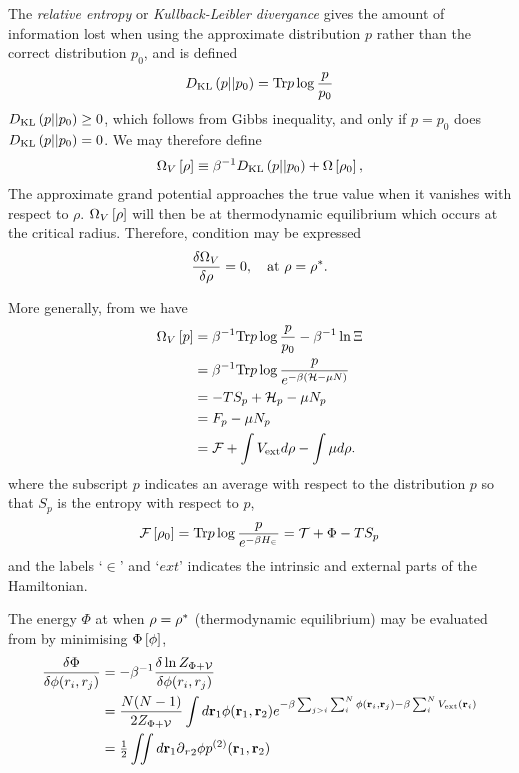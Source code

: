 {The {\em relative entropy } or {\em Kullback-Leibler divergance} gives the amount of information lost 
when using the approximate distribution  $p$ rather than the correct distribution $p_0$,
and is defined
\begin{align}
  D_{\text {KL}}\left( {p}||{p_0} \right) = \textrm{Tr} p \log \frac{p}{p_0} \label{eqn:nuc:KLD}
\end{align}
$D_{\text {KL}}\left( {p}||{p_0} \right) \ge 0$, which follows from Gibbs inequality, and only if $p=p_0$ does $D_{\text {KL}}\left( {p}||{p_0} \right) = 0$.
We may therefore define
\begin{align}
 \Omega_V\left[ \rho \right] \equiv \beta^{-1}D_{\text {KL}}\left( {p}||{p_0} \right)+   \Omega\left[ \rho_0 \right], 
\end{align}
The approximate  grand potential approaches the true value when 
it vanishes  with respect to $\rho$.
 $\Omega_V\left[ \rho \right] $ will then be at thermodynamic equilibrium
which occurs at the critical radius.
Therefore,
condition \eqnref{}
may be expressed\cite{Oxtoby1992}
\begin{align}
  \frac{\delta \Omega_V}{\delta \rho} =0,\quad\text{at $\rho = {\rho^\ast}$.} \label{eqn:DFT:astar}
\end{align}

More generally, from \eqnref{} we have
\begin{align}
  \Omega_V\left[ p \right] &= \beta^{-1} \textrm{Tr} p \log \frac{p}{p_0}  - \beta^{-1}\ln \Xi \\
  &= \beta^{-1} \textrm{Tr} p \log \frac{p}{e^{-\beta\left( {\cal H} - \mu N \right)}}\\
  &= - T S_p + {\cal H}_p - \mu N_p \\
  &= F_p - \mu N_p\\
 &= {\cal F} + \int V_{\text{ext}} d\rho - \int \mu d \rho.
\end{align}
where the subscript $p$ indicates an average with respect to the distribution $p$ so that  $S_p$ is the entropy with respect to $p$,
\begin{align}
 {\cal F}\left[ \rho_0 \right] = \textrm{Tr} p \log\frac{p}{e^{-\beta H_\in}} = {\cal{T}} + \Phi - TS_p
\end{align}
and the labels `$\in$' and `$ext$' indicates the intrinsic and external parts of the  Hamiltonian.

The energy $\Phi$ at when  $\rho = {\rho^\ast}$ (thermodynamic equilibrium)
may be evaluated from by minimising $\Phi\left[ \phi \right]$,
\begin{align}
\frac{\delta \Phi}{\delta \phi(r_i, r_j) } &= - \beta^{-1} \frac{\delta \ln Z_{\Phi+{\cal{V}}}}{\delta \phi(r_i, r_j)} \\
&= \frac{N(N-1)}{2 Z_{\Phi+{\cal{V}}}}\int d{\mathbf{\textbf{r}}}_1 \phi(\textbf{r}_1,\textbf{r}_2) e^{-\beta\sum_{j>i} \sum_i^N \phi(\textbf{r}_i, \textbf{r}_j)-\beta\sum_i^N V_{\text{ext}}(\textbf{r}_i)} \\
&= \tfrac{1}{2} \iint d\textbf{r}_1 {\operatorname{\partial}_r}_2 \phi p^{(2)}(\textbf{r}_1,\textbf{r}_2)
\end{align}


}
